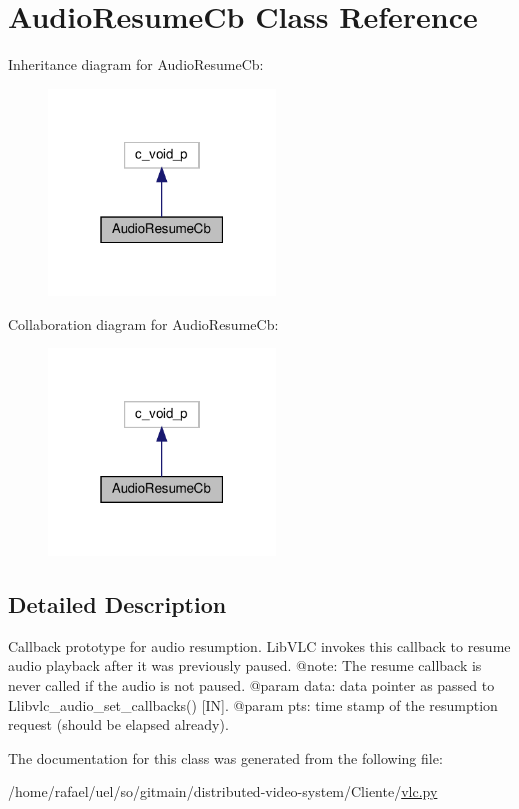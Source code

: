 \hypertarget{classvlc_1_1_audio_resume_cb}{}\section{Audio\+Resume\+Cb Class Reference}
\label{classvlc_1_1_audio_resume_cb}


Inheritance diagram for Audio\+Resume\+Cb\+:
\nopagebreak
\begin{figure}[H]
\begin{center}
\leavevmode
\includegraphics[width=171pt]{classvlc_1_1_audio_resume_cb__inherit__graph}
\end{center}
\end{figure}


Collaboration diagram for Audio\+Resume\+Cb\+:
\nopagebreak
\begin{figure}[H]
\begin{center}
\leavevmode
\includegraphics[width=171pt]{classvlc_1_1_audio_resume_cb__coll__graph}
\end{center}
\end{figure}


\subsection{Detailed Description}
\begin{DoxyVerb}Callback prototype for audio resumption.
LibVLC invokes this callback to resume audio playback after it was
previously paused.
@note: The resume callback is never called if the audio is not paused.
@param data: data pointer as passed to L{libvlc_audio_set_callbacks}() [IN].
@param pts: time stamp of the resumption request (should be elapsed already).
\end{DoxyVerb}
 

The documentation for this class was generated from the following file\+:\begin{DoxyCompactItemize}
\item 
/home/rafael/uel/so/gitmain/distributed-\/video-\/system/\+Cliente/\hyperlink{vlc_8py}{vlc.\+py}\end{DoxyCompactItemize}
